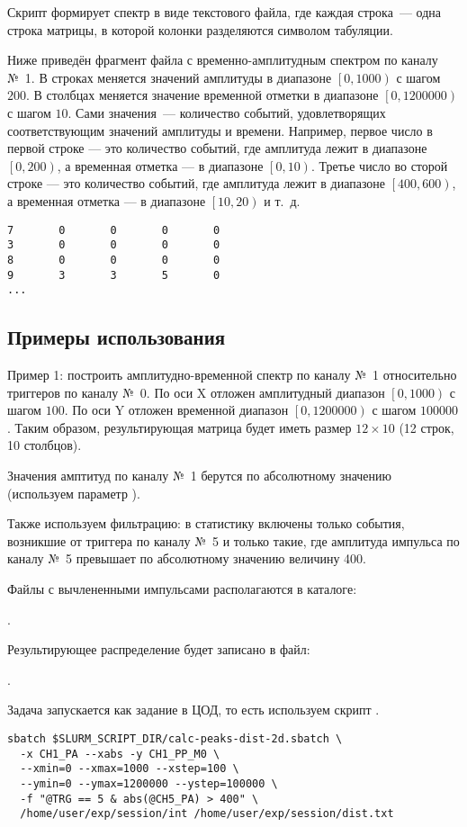 Скрипт формирует спектр в виде текстового файла, где каждая строка~--- одна строка матрицы, в которой колонки разделяются символом табуляции.

Ниже приведён фрагмент файла с временно-амплитудным спектром по каналу №~1. В строках меняется значений амплитуды в диапазоне $\left[0, 1000\right)$ с шагом $200$. В столбцах меняется значение временной отметки в диапазоне $\left[0, 1200000\right)$ с шагом $10$. Сами значения~--- количество событий, удовлетворящих соответствующим значений амплитуды и времени. Например, первое число в первой строке --- это количество событий, где амплитуда лежит в диапазоне $\left[0, 200\right)$, а временная отметка --- в диапазоне $\left[0, 10\right)$. Третье число во сторой строке --- это количество событий, где амплитуда лежит в диапазоне $\left[400, 600\right)$, а временная отметка --- в диапазоне $\left[10, 20\right)$ и т.~д.

\begin{lstlisting}
7       0       0       0       0
3       0       0       0       0
8       0       0       0       0
9       3       3       5       0
...
\end{lstlisting}

\subsection{Примеры использования}

Пример 1: построить амплитудно-временной спектр по каналу №~1 относительно триггеров по каналу №~0. По оси X отложен амплитудный диапазон $\left[0, 1000\right)$ с шагом $100$. По оси Y отложен временной диапазон $\left[0, 1200000\right)$ с шагом $100000$. Таким образом, результирующая матрица будет иметь размер $12 \times 10$ (12 строк, 10 столбцов).

Значения амптитуд по каналу №~1 берутся по абсолютному значению (используем параметр ).

Также используем фильтрацию: в статистику включены только события, возникшие от триггера по каналу №~5 и только такие, где амплитуда импульса по каналу №~5 превышает по абсолютному значению величину 400.

Файлы с вычлененными импульсами располагаются в каталоге:

 . 

Результирующее распределение будет записано в файл:

 .

Задача запускается как задание в ЦОД, то есть используем скрипт .

\begin{lstlisting}
sbatch $SLURM_SCRIPT_DIR/calc-peaks-dist-2d.sbatch \
  -x CH1_PA --xabs -y CH1_PP_M0 \
  --xmin=0 --xmax=1000 --xstep=100 \
  --ymin=0 --ymax=1200000 --ystep=100000 \
  -f "@TRG == 5 & abs(@CH5_PA) > 400" \
  /home/user/exp/session/int /home/user/exp/session/dist.txt
\end{lstlisting}

